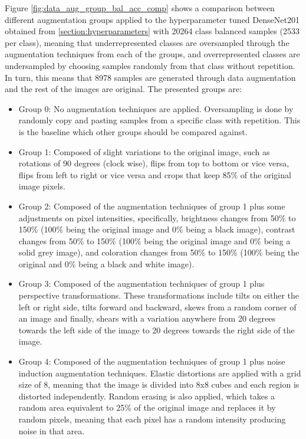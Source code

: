     Figure \ref{fig:data_aug_group_bal_acc_comp} shows a comparison between different augmentation groups applied to the hyperparameter tuned DenseNet201 obtained from \autoref{section:hyperparameters} with 20264 class balanced samples (2533 per class), meaning that underrepresented classes are oversampled through the augmentation techniques from each of the groups, and overrepresented classes are undersampled by choosing samples randomly from that class without repetition. In turn, this means that 8978 samples are generated through data augmentation and the rest of the images are original. The presented groups are:
    \begin{itemize}
        \item Group 0: No augmentation techniques are applied. Oversampling is done by randomly copy and pasting samples from a specific class with repetition. This is the baseline which other groups should be compared against.
        \item Group 1: Composed of slight variations to the original image, such as rotations of 90 degrees (clock wise), flips from top to bottom or vice versa, flips from left to right or vice versa and crops that keep 85\% of the original image pixels. 
        \item Group 2: Composed of the augmentation techniques of group 1 plus some adjustments on pixel intensities, specifically, brightness changes from 50\% to 150\% (100\% being the original image and 0\% being a black image), contrast changes from 50\% to 150\% (100\% being the original image and 0\% being a solid grey image), and coloration changes from 50\% to 150\% (100\% being the original and 0\% being a black and white image).
        \item Group 3: Composed of the augmentation techniques of group 1 plus perspective transformations. These transformations include tilts on either the left or right side, tilts forward and backward, skews from a random corner of an image and finally, shears with a variation anywhere from 20 degrees towards the left side of the image to 20 degrees towards the right side of the image. 
        \item Group 4: Composed of the augmentation techniques of group 1 plus noise induction augmentation techniques. Elastic distortions are applied with a grid size of 8, meaning that the image is divided into 8x8 cubes and each region is distorted independently. Random erasing is also applied, which takes a random area equivalent to 25\% of the original image and replaces it by random pixels, meaning that each pixel has a random intensity producing noise in that area.
    \end{itemize}
